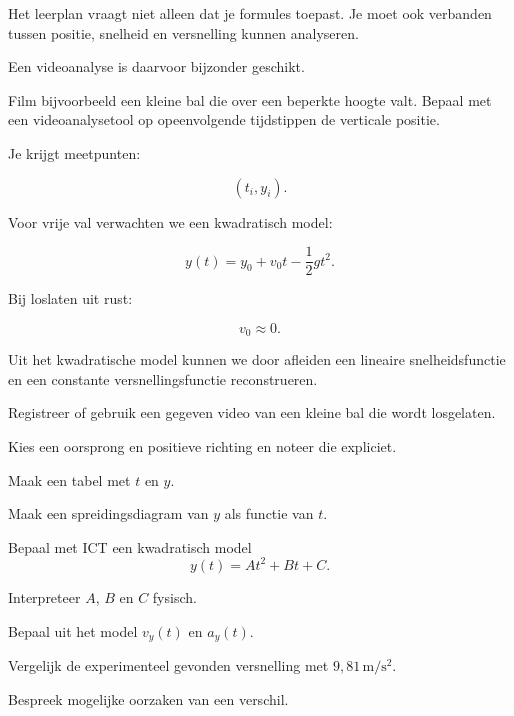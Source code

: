 \documentclass{ximera}
\begin{document}


Het leerplan vraagt niet alleen dat je formules toepast. Je moet ook
verbanden tussen positie, snelheid en versnelling kunnen analyseren.

Een videoanalyse is daarvoor bijzonder geschikt.

Film bijvoorbeeld een kleine bal die over een beperkte hoogte valt.
Bepaal met een videoanalysetool op opeenvolgende tijdstippen de
verticale positie.

Je krijgt meetpunten:

\[
(t_i,y_i).
\]

Voor vrije val verwachten we een kwadratisch model:

\[
y(t)=y_0+v_0t-\frac12gt^2.
\]

Bij loslaten uit rust:

\[
v_0\approx0.
\]

Uit het kwadratische model kunnen we door afleiden een lineaire
snelheidsfunctie en een constante versnellingsfunctie reconstrueren.


\begin{oefening}{\oefU\ESS}

Registreer of gebruik een gegeven video van een kleine bal die wordt
losgelaten.

\begin{question}
Kies een oorsprong en positieve richting en noteer die expliciet.
\end{question}

\begin{question}
Maak een tabel met $t$ en $y$.
\end{question}

\begin{question}
Maak een spreidingsdiagram van $y$ als functie van $t$.
\end{question}

\begin{question}
Bepaal met ICT een kwadratisch model
\[
y(t)=At^2+Bt+C.
\]
\end{question}

\begin{question}
Interpreteer $A$, $B$ en $C$ fysisch.
\end{question}

\begin{question}
Bepaal uit het model $v_y(t)$ en $a_y(t)$.
\end{question}

\begin{question}
Vergelijk de experimenteel gevonden versnelling met
$9,81\,\mathrm{m/s^2}$.
\end{question}

\begin{question}
Bespreek mogelijke oorzaken van een verschil.
\end{question}

\end{oefening}
\end{document}
